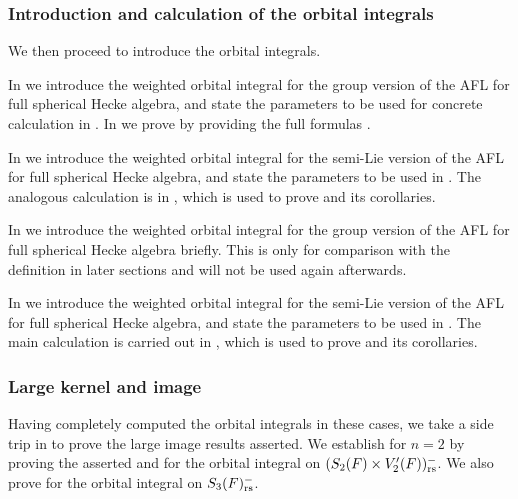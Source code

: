 \subsubsection{Introduction and calculation of the orbital integrals}
\ifthesis
We then proceed to introduce the orbital integrals.
\begin{itemize}
  \ii In  we introduce the weighted orbital integral
  for the group version of the AFL for full spherical Hecke algebra,
  and state the parameters to be used for concrete calculation in .
  In  we prove 
  by providing the full formulas
  .

  \ii In  we introduce the weighted orbital integral
  for the semi-Lie version of the AFL for full spherical Hecke algebra,
  and state the parameters to be used in .
  The analogous calculation is in ,
  which is used to prove  and its corollaries.
\end{itemize}
\fi
\ifpaper
In  we introduce the weighted orbital integral
for the group version of the AFL for full spherical Hecke algebra briefly.
This is only for comparison with the definition in later sections
and will not be used again afterwards.

In  we introduce the weighted orbital integral
for the semi-Lie version of the AFL for full spherical Hecke algebra,
and state the parameters to be used in .
The main calculation is carried out in ,
which is used to prove  and its corollaries.
\fi

\subsubsection{Large kernel and image}
Having completely computed the orbital integrals in these cases,
we take a side trip in  to prove the large image results asserted.
We establish  for $n = 2$ by proving the asserted
 and 
for the orbital integral on $(S_2(F) \times V'_2(F))_{\mathrm{rs}}^-$.
\ifthesis
We also prove  for the orbital integral on $S_3(F)_{\mathrm{rs}}^-$.
\fi

